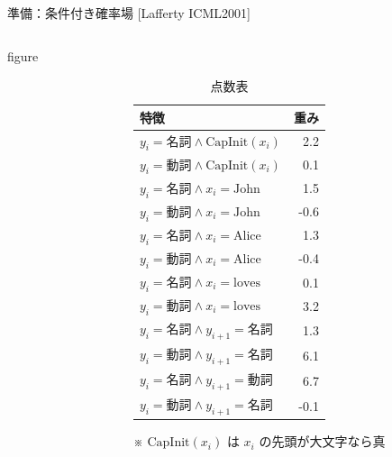 \begin{block}{準備：条件付き確率場 {\small{}[Lafferty ICML2001]}}
\begin{columns}[onlytextwidth]
\begin{column}[t]{0.6\textwidth}
\begin{beamercolorbox}{figure}
      \end{beamercolorbox}
    \end{column}
    \begin{column}[t]{0.4\textwidth}\\
      \footnotesize
      \begin{table}
        \centering
        \begin{tabular}{l@{\hskip2em}r}
          \hline
          特徴 & 重み \\
          \hline
          $y_i = \text{名詞} \land \mathrm{CapInit}(x_i)$ & 2.2 \\
          $y_i = \text{動詞} \land \mathrm{CapInit}(x_i)$ & 0.1 \\
          $y_i = \text{名詞} \land x_i = \text{John}$ & 1.5 \\
          $y_i = \text{動詞} \land x_i = \text{John}$ & -0.6 \\
          $y_i = \text{名詞} \land x_i = \text{Alice}$ & 1.3 \\
          $y_i = \text{動詞} \land x_i = \text{Alice}$ & -0.4 \\
          $y_i = \text{名詞} \land x_i = \text{loves}$ & 0.1 \\
          $y_i = \text{動詞} \land x_i = \text{loves}$ & 3.2 \\
          \hline
          $y_i = \text{名詞} \land y_{i+1} = \text{名詞}$ & 1.3 \\
          $y_i = \text{動詞} \land y_{i+1} = \text{名詞}$ & 6.1 \\
          $y_i = \text{名詞} \land y_{i+1} = \text{動詞}$ & 6.7 \\
          $y_i = \text{動詞} \land y_{i+1} = \text{名詞}$ & -0.1 \\
          \hline
        \end{tabular}
        \caption{点数表}
      \end{table}
      \scriptsize
      ※ $\mathrm{CapInit}(x_i)$ は $x_i$ の先頭が大文字なら真
    \end{column}
  \end{columns}
\end{block}